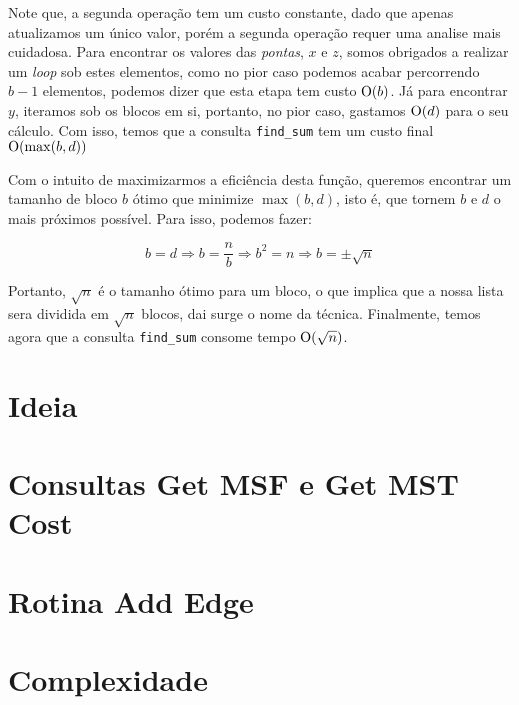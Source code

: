 Note que, a segunda operação tem um custo constante, dado que apenas atualizamos um único valor, porém a segunda operação requer uma analise mais cuidadosa. Para encontrar os valores das \emph{pontas}, $x$ e $z$, somos obrigados a realizar um \emph{loop} sob estes elementos, como no pior caso podemos acabar percorrendo $b-1$ elementos, podemos dizer que esta etapa tem custo $\mathrm{O}(b)$. Já para encontrar $y$, iteramos sob os blocos em si, portanto, no pior caso, gastamos $\mathrm{O}(d)$ para o seu cálculo. Com isso, temos que a consulta \texttt{find\_sum} tem um custo final $\mathrm{O}(\max(b, d))$

Com o intuito de maximizarmos a eficiência desta função, queremos encontrar um tamanho de bloco $b$ ótimo que minimize $\max(b, d)$, isto é, que tornem $b$ e $d$ o mais próximos possível. Para isso, podemos fazer:

\begin{equation}
    b = d \Rightarrow
    b = \frac{n}{b} \Rightarrow
    b^2 = n \Rightarrow
    b = \pm \sqrt{n}
\end{equation}

Portanto, $\sqrt{n}$ é o tamanho ótimo para um bloco, o que implica que a nossa lista sera dividida em $\sqrt{n}$ blocos, dai surge o nome da técnica. Finalmente, temos agora que a consulta \texttt{find\_sum} consome tempo $\mathrm{O}(\sqrt{n})$.


\section{Ideia}
\label{sec:rmsf-ideia}



\section{Consultas Get MSF e Get MST Cost}
\label{sec:rmsf-get-msf}






\section{Rotina Add Edge}
\label{sec:rmsf-add-edge}



\section{Complexidade}
\label{sec:rmsf-complexidade}
